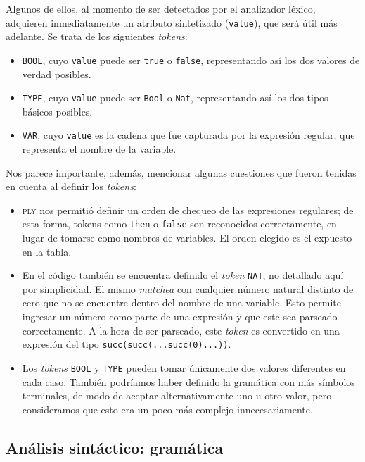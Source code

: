 \documentclass[11pt]{article}
\begin{document}
Algunos de ellos, al momento de ser detectados por el analizador léxico,
adquieren inmediatamente un atributo sintetizado (\verb|value|), que será
útil más adelante. Se trata de los siguientes \emph{tokens}:
\begin{itemize}
\item \verb|BOOL|, cuyo \verb|value| puede ser \verb|true| o
	\verb|false|, representando así los dos valores de verdad posibles.
\item \verb|TYPE|, cuyo \verb|value| puede ser \verb|Bool| o
	\verb|Nat|, representando así los dos tipos básicos posibles.
\item \verb|VAR|, cuyo \verb|value| es la cadena que fue capturada
	por la expresión regular, que representa el nombre de la variable.
\end{itemize}

Nos parece importante, además, mencionar algunas cuestiones que fueron
tenidas en cuenta al definir los \emph{tokens}:
\begin{itemize}
\item \textsc{ply} nos permitió definir un orden de chequeo de las expresiones
	regulares; de esta forma, tokens como \verb|then| o
    \verb|false| son reconocidos correctamente, en lugar de tomarse
    como nombres de variables. El orden elegido es el expuesto en la tabla.
  
\item En el código también se encuentra definido el \emph{token} \verb|NAT|, no detallado aquí por simplicidad. El mismo \emph{matchea} con cualquier número natural distinto de cero que no se encuentre dentro del nombre de una variable. Esto permite ingresar un número como parte de una expresión y que este sea parseado correctamente. A la hora de ser parseado, este \emph{token} es convertido en una expresión del tipo \verb|succ(succ(...succ(0)...))|.
  
\item Los \emph{tokens} \verb|BOOL| y \verb|TYPE| pueden tomar únicamente dos valores diferentes en cada caso. También podríamos haber definido la gramática con más símbolos terminales, de modo de aceptar alternativamente uno u otro valor, pero consideramos que esto era un poco más complejo innecesariamente.
\end{itemize}


\subsection{Análisis sintáctico: gramática}
\end{document}
